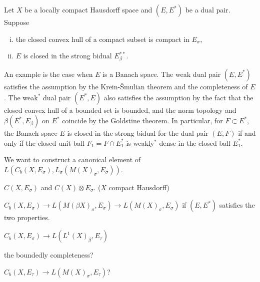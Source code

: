 \documentclass{../../large}
\begin{document}
\begin{prb}
Let $X$ be a locally compact Hausdorff space and $(E,E^*)$ be a dual pair.
Suppose
\begin{enumerate}[(i)]
\item the closed convex hull of a compact subset is compact in $E_\sigma$,
\item $E$ is closed in the strong bidual $E^{**}_\beta$.
\end{enumerate}
An example is the case when $E$ is a Banach space.
The weak dual pair $(E,E^*)$ satisfies the assumption by the Krein-\v Smulian theorem and the completeness of $E$.
The weak$^*$ dual pair $(E^*,E)$ also satisfies the assumption by the fact that the closed convex hull of a bounded set is bounded, and the norm topology and $\beta(E^*,E_\beta)$ on $E^*$ coincide by the Goldstine theorem.
In particular, for $F\subset E^*$, the Banach space $E$ is closed in the strong bidual for the dual pair $(E,F)$ if and only if the closed unit ball $F_1=F\cap E^*_1$ is weakly$^*$ dense in the closed ball $E^*_1$.

We want to construct a canonical element of $L(C_b(X,E_\sigma),L_\sigma(M(X)_\sigma,E_\sigma))$.

\begin{parts}
\item $C(X,E_\sigma)$ and $C(X)\otimes E_\sigma$. ($X$ compact Hausdorff)
\item $C_b(X,E_\sigma)\to L(M(\beta X)_\sigma,E_\sigma)\to L(M(X)_\sigma,E_\sigma)$ if $(E,E^*)$ satisfies the two properties.
\item $C_b(X,E_\sigma)\to L(L^1(X)_\beta,E_\tau)$
\item the boundedly completeness?
\item $C_b(X,E_\tau)\to L(M(X)_\sigma,E_\tau)$?
\end{parts}
\end{prb}
\end{document}
